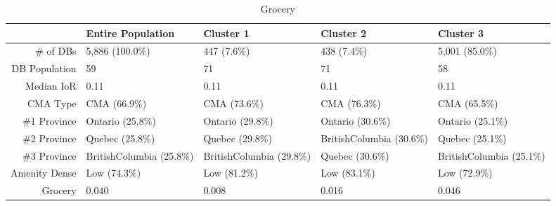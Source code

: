 \documentclass[11pt, a4paper]{article}
\begin{document}
 \pagebreak 
 
\begin{sidewaystable}[ht]
\centering
\begin{tabular}{rllll}
  \hline
 & Entire Population & Cluster 1 & Cluster 2 & Cluster 3 \\ 
  \hline
\# of DBs & 5,886 (100.0\%) & 447 (7.6\%) & 438 (7.4\%) & 5,001 (85.0\%) \\ 
  DB Population & 59 & 71 & 71 & 58 \\ 
  Median IoR & 0.11 & 0.11 & 0.11 & 0.11 \\ 
  CMA Type & CMA (66.9\%) & CMA (73.6\%) & CMA (76.3\%) & CMA (65.5\%) \\ 
  \#1 Province & Ontario (25.8\%) & Ontario (29.8\%) & Ontario (30.6\%) & Ontario (25.1\%) \\ 
  \#2 Province & Quebec (25.8\%) & Quebec (29.8\%) & BritishColumbia (30.6\%) & Quebec (25.1\%) \\ 
  \#3 Province & BritishColumbia (25.8\%) & BritishColumbia (29.8\%) & Quebec (30.6\%) & BritishColumbia (25.1\%) \\ 
  Amenity Dense & Low (74.3\%) & Low (81.2\%) & Low (83.1\%) & Low (72.9\%) \\ 
  Grocery & 0.040 & 0.008 & 0.016 & 0.046 \\ 
   \hline
\end{tabular}
\caption{Grocery} 
\end{sidewaystable}





 \pagebreak 
 
\end{document}
